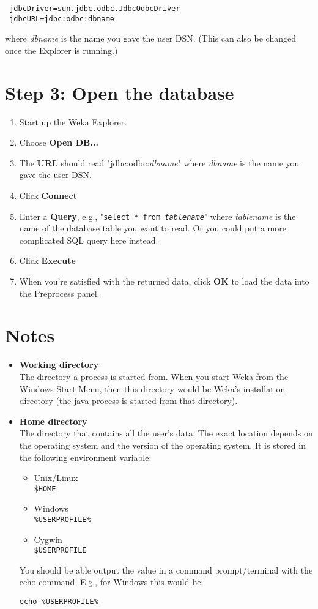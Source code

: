 \begin{verbatim}
 jdbcDriver=sun.jdbc.odbc.JdbcOdbcDriver
 jdbcURL=jdbc:odbc:dbname
\end{verbatim}

\noindent where \textit{dbname} is the name you gave the user DSN. (This can also be changed once the Explorer is running.)

\newpage
\section*{Step 3: Open the database}
\begin{enumerate}
	\item Start up the Weka Explorer.
	\item Choose \textbf{Open DB...}
	\item The \textbf{URL} should read "jdbc:odbc:\textit{dbname}" where \textit{dbname} is the name you gave the user DSN.
	\item Click \textbf{Connect}
	\item Enter a \textbf{Query}, e.g., "\texttt{select * from \textit{tablename}}" where \textit{tablename} is the name of the database table you want to read. Or you could put a more complicated SQL query here instead.
	\item Click \textbf{Execute}
	\item When you're satisfied with the returned data, click \textbf{OK} to load the data into the Preprocess panel.
\end{enumerate}

\section*{Notes}
\begin{itemize}
 \item \textbf{Working directory} \\
  The directory a process is started from. When you start Weka from the Windows Start Menu, then this directory would be Weka's installation directory (the java process is started from that directory).
 \item \textbf{Home directory} \\
 The directory that contains all the user's data. The exact location depends on the operating system and the version of the operating system. It is stored in the following environment variable:
 \begin{itemize}
  \item Unix/Linux \\
  \texttt{\$HOME}
  \item Windows \\
   \texttt{\%USERPROFILE\%}
  \item Cygwin \\
    \texttt{\$USERPROFILE}
 \end{itemize}
  You should be able output the value in a command prompt/terminal with the echo command. E.g., for Windows this would be:

  \texttt{echo \%USERPROFILE\%}
\end{itemize}
